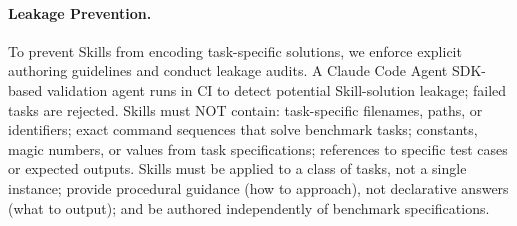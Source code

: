 \paragraph{Leakage Prevention.}
\label{sec:leakage}
To prevent Skills from encoding task-specific solutions, we enforce explicit authoring guidelines and conduct leakage audits.
A Claude Code Agent SDK-based validation agent runs in CI to detect potential Skill-solution leakage; failed tasks are rejected.
Skills must NOT contain: task-specific filenames, paths, or identifiers; exact command sequences that solve benchmark tasks; constants, magic numbers, or values from task specifications; references to specific test cases or expected outputs.
Skills must be applied to a class of tasks, not a single instance; provide procedural guidance (how to approach), not declarative answers (what to output); and be authored independently of benchmark specifications.






